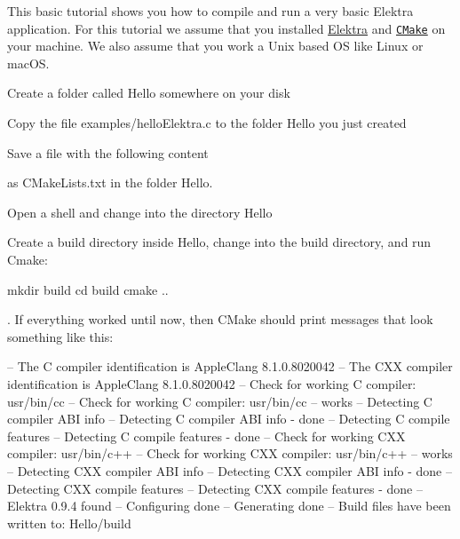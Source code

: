 This basic tutorial shows you how to compile and run a very basic Elektra application. For this tutorial we assume that you installed \hyperlink{doc_INSTALL_md}{Elektra} and \href{http://cmake.org}{\tt C\+Make} on your machine. We also assume that you work a Unix based OS like Linux or mac\+OS.


\begin{DoxyEnumerate}
\item Create a folder called {\ttfamily Hello} somewhere on your disk
\item Copy the file {\ttfamily examples/hello\+Elektra.\+c} to the folder {\ttfamily Hello} you just created
\item Save a file with the following content
\end{DoxyEnumerate}




as {\ttfamily C\+Make\+Lists.\+txt} in the folder {\ttfamily Hello}.


\begin{DoxyEnumerate}
\item Open a shell and change into the directory {\ttfamily Hello}
\item Create a build directory inside {\ttfamily Hello}, change into the build directory, and run Cmake\+:
\end{DoxyEnumerate}


\begin{DoxyCode}
mkdir build
cd build
cmake ..
\end{DoxyCode}


. If everything worked until now, then C\+Make should print messages that look something like this\+:


\begin{DoxyCode}
-- The C compiler identification is AppleClang 8.1.0.8020042
-- The CXX compiler identification is AppleClang 8.1.0.8020042
-- Check for working C compiler: usr/bin/cc
-- Check for working C compiler: usr/bin/cc -- works
-- Detecting C compiler ABI info
-- Detecting C compiler ABI info - done
-- Detecting C compile features
-- Detecting C compile features - done
-- Check for working CXX compiler: usr/bin/c++
-- Check for working CXX compiler: usr/bin/c++ -- works
-- Detecting CXX compiler ABI info
-- Detecting CXX compiler ABI info - done
-- Detecting CXX compile features
-- Detecting CXX compile features - done
-- Elektra 0.9.4 found
-- Configuring done
-- Generating done
-- Build files have been written to: Hello/build
\end{DoxyCode}



